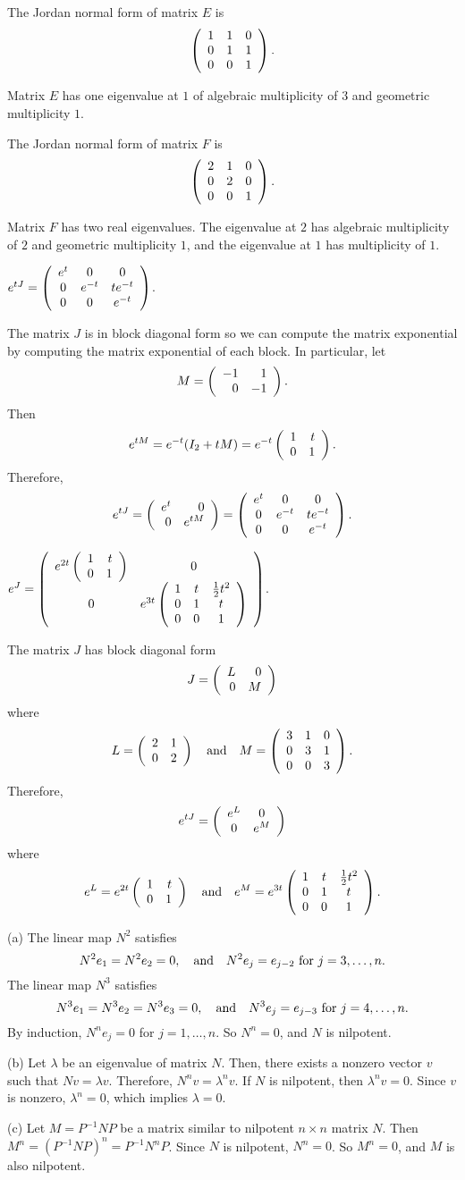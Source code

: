  \ans The Jordan normal form of matrix $E$ is
\[
\left(\begin{array}{rrr} 1 & 1 & 0 \\ 0 & 1 & 1 \\ 0 & 0 & 1\end{array}\right).
\]

\soln Matrix $E$ has one eigenvalue at $1$ of algebraic multiplicity of $3$ and 
geometric multiplicity $1$.

 \ans The Jordan normal form of matrix $F$ is
\[
\left(\begin{array}{rrr} 2 & 1 & 0 \\ 0 & 2 & 0 \\ 0 & 0 & 1\end{array}\right).
\]

\soln Matrix $F$ has two real eigenvalues.  The eigenvalue at $2$ has
algebraic multiplicity of $2$ and geometric multiplicity $1$, and the eigenvalue at 
$1$ has multiplicity of $1$.

 \ans $e^{tJ} =
\left(\begin{array}{ccc} e^t & 0 & 0 \\ 0 & e^{-t} & te^{-t} \\ 0 & 0 & e^{-t}\end{array}\right)$.

\soln The matrix $J$ is in block diagonal form so we can compute the matrix exponential 
by computing the matrix exponential of each block.  In particular, let 
\[
M = \left(\begin{array}{rr} -1 & 1\\ 0 &-1\end{array}\right).
\]
Then 
\[
e^{tM} = e^{-t}(I_2+tM) = e^{-t}\left(\begin{array}{rr} 1 & t\\ 0 &1\end{array}\right).
\]
Therefore,
\[
e^{tJ} = \left(\begin{array}{rr} e^t & 0\\ 0 &e^{tM}\end{array}\right) = 
\left(\begin{array}{ccc} e^t & 0 & 0 \\ 0 & e^{-t} & te^{-t} \\ 0 & 0 & e^{-t}\end{array}\right).
\]

 \ans $e^J = 
\left(\begin{array}{cc} e^{2t}\left(\begin{array}{rr} 1 & t\\ 0 &1\end{array}\right) & 0\\ 0 &e^{3t}\left(\begin{array}{ccc} 1 & t & \frac{1}{2}t^2 \\ 0 & 1 & t \\ 0 & 0 & 1\end{array}\right)\end{array}\right)$.

\soln  The matrix $J$ has block diagonal form 
\[
J = \left(\begin{array}{rr} L & 0\\ 0 &M\end{array}\right)
\]
where
\[
L = \left(\begin{array}{rr} 2 & 1\\ 0 &2\end{array}\right) \quad\mbox{and}\quad M = \left(\begin{array}{rrr} 3 & 1 & 0 \\ 0 & 3 & 1 \\ 0 & 0 & 3\end{array}\right).
\]
Therefore,
\[
e^{tJ} = \left(\begin{array}{cc} e^L & 0\\ 0 &e^M\end{array}\right)
\]
where
\[
e^L = e^{2t}\left(\begin{array}{rr} 1 & t\\ 0 &1\end{array}\right) \quad\mbox{and}\quad 
e^M = e^{3t}\left(\begin{array}{ccc} 1 & t & \frac{1}{2}t^2 \\ 0 & 1 & t \\ 0 & 0 & 1\end{array}\right).
\]


(a) The linear map $N^2$ satisfies
\[
N^2e_1 = N^2e_2 = 0, \quad\mbox{and}\quad N^2e_j = e_{j - 2}
\mbox{ for } j = 3,\ldots,n.
\]
The linear map $N^3$ satisfies
\[
N^3e_1 = N^3e_2 = N^3e_3 = 0, \quad\mbox{and}\quad N^3e_j = e_{j - 3} \mbox{ for }
j = 4,\ldots,n.
\]
By induction, $N^ne_j = 0$ for $j = 1,\dots,n$.  So $N^n = 0$, and $N$
is nilpotent.

(b) Let $\lambda$ be an eigenvalue of matrix $N$.  Then, there
exists a nonzero vector $v$ such that $Nv = \lambda v$.  Therefore,
$N^nv = \lambda^nv$.  If $N$ is nilpotent, then $\lambda^nv = 0$.  Since
$v$ is nonzero, $\lambda^n = 0$, which implies $\lambda = 0$.

(c) Let $M = P^{-1}NP$ be a matrix similar to nilpotent $n \times n$
matrix $N$.  Then $M^n = (P^{-1}NP)^n = P^{-1}N^nP$.  Since $N$ is
nilpotent, $N^n = 0$.  So $M^n = 0$, and $M$ is also nilpotent.

